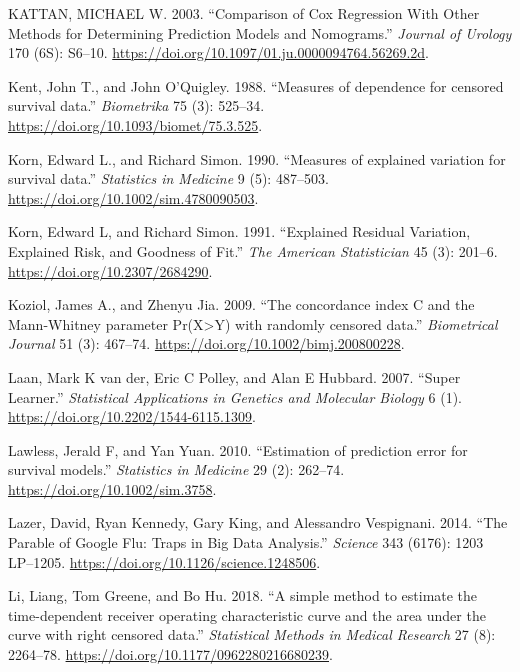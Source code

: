 \documentclass[
  letterpaper,
]{scrbook}
\newlength{\cslhangindent}
\newlength{\cslentryspacingunit} %
\newenvironment{CSLReferences}[2] %
 {%
  \setlength{\parindent}{0pt}
  \ifodd #1
  \let\oldpar\par
  \def\par{\hangindent=\cslhangindent\oldpar}
  \fi
  \setlength{\parskip}{#2\cslentryspacingunit}
 }%
 {}
\theoremstyle{plain}
\theoremstyle{definition}
\theoremstyle{remark}
\begin{document}
\begin{CSLReferences}{1}{0}
\leavevmode{}%
KATTAN, MICHAEL W. 2003. {``{Comparison of Cox Regression With Other
Methods for Determining Prediction Models and Nomograms}.''}
\emph{Journal of Urology} 170 (6S): S6--10.
\url{https://doi.org/10.1097/01.ju.0000094764.56269.2d}.

\leavevmode{}%
Kent, John T., and John O'Quigley. 1988. {``{Measures of dependence for
censored survival data}.''} \emph{Biometrika} 75 (3): 525--34.
\url{https://doi.org/10.1093/biomet/75.3.525}.

\leavevmode{}%
Korn, Edward L., and Richard Simon. 1990. {``{Measures of explained
variation for survival data}.''} \emph{Statistics in Medicine} 9 (5):
487--503. \url{https://doi.org/10.1002/sim.4780090503}.

\leavevmode{}%
Korn, Edward L, and Richard Simon. 1991. {``{Explained Residual
Variation, Explained Risk, and Goodness of Fit}.''} \emph{The American
Statistician} 45 (3): 201--6. \url{https://doi.org/10.2307/2684290}.

\leavevmode{}%
Koziol, James A., and Zhenyu Jia. 2009. {``{The concordance index C and
the Mann-Whitney parameter Pr(X{\textgreater{}}Y) with randomly censored
data}.''} \emph{Biometrical Journal} 51 (3): 467--74.
\url{https://doi.org/10.1002/bimj.200800228}.

\leavevmode{}%
Laan, Mark K van der, Eric C Polley, and Alan E Hubbard. 2007. {``{Super
Learner}.''} \emph{Statistical Applications in Genetics and Molecular
Biology} 6 (1). \url{https://doi.org/10.2202/1544-6115.1309}.

\leavevmode{}%
Lawless, Jerald F, and Yan Yuan. 2010. {``{Estimation of prediction
error for survival models}.''} \emph{Statistics in Medicine} 29 (2):
262--74. \url{https://doi.org/10.1002/sim.3758}.

\leavevmode{}%
Lazer, David, Ryan Kennedy, Gary King, and Alessandro Vespignani. 2014.
{``{The Parable of Google Flu: Traps in Big Data Analysis}.''}
\emph{Science} 343 (6176): 1203 LP--1205.
\url{https://doi.org/10.1126/science.1248506}.

\leavevmode{}%
Li, Liang, Tom Greene, and Bo Hu. 2018. {``{A simple method to estimate
the time-dependent receiver operating characteristic curve and the area
under the curve with right censored data}.''} \emph{Statistical Methods
in Medical Research} 27 (8): 2264--78.
\url{https://doi.org/10.1177/0962280216680239}.


\end{CSLReferences}
\end{document}
